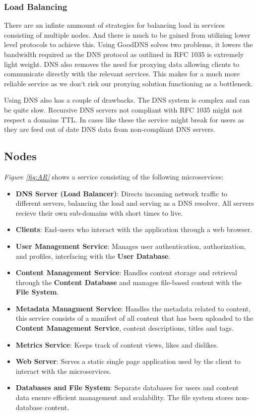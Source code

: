 \documentclass[12pt]{article}
\begin{document}
\subsubsection{Load Balancing}
There are an infinte ammount of strategies for balancing load in services consisting of multiple nodes.
And there is much to be gained from utilizing lower level protocols to achieve this. Using GoodDNS solves
two problems, it lowers the bandwidth required as the DNS protocol as outlined in RFC 1035 is extremely light weight.
DNS also removes the need for proxying data allowing clients to communicate directly with the relevant services.
This makes for a much more reliable service as we don`t risk our proxying solution functioning as a bottleneck.

Using DNS also has a couple of drawbacks. The DNS system is complex and can be quite slow.
Recursive DNS servers not compliant with RFC 1035 might not respect a domains TTL.
In cases like these the service might break for users as they are feed out of date DNS data
from non-compliant DNS servers.

\subsection{Nodes}

\textit{Figure \ref{fig:AR}} shows a service consisting of the following microservices:

\begin{itemize}
    \item \textbf{DNS Server (Load Balancer)}: Directs incoming network traffic to different servers, 
    balancing the load and serving as a DNS resolver. All servers recieve their own sub-domains with short times to live.
    \item \textbf{Clients}: End-users who interact with the application through a web browser.
    \item \textbf{User Management Service}: Manages user authentication, authorization, and profiles, interfacing with the \textbf{User Database}.
    \item \textbf{Content Management Service}: Handles content storage and retrieval through the \textbf{Content Database} and manages file-based content with the \textbf{File System}.
    \item \textbf{Metadata Managment Service}: Handles the metadata related to content, this service consists of a manifest of all content that has been uploaded to the \textbf{Content Management Service}, content descriptions, titles and tags.
    \item \textbf{Metrics Service}: Keeps track of content views, likes and dislikes. 
    \item \textbf{Web Server}: Serves a static single page application used by the client to interact with the microservices.
    \item \textbf{Databases and File System}: Separate databases for users and content data ensure efficient management and scalability. The file system stores non-database content.
\end{itemize}
\end{document}
